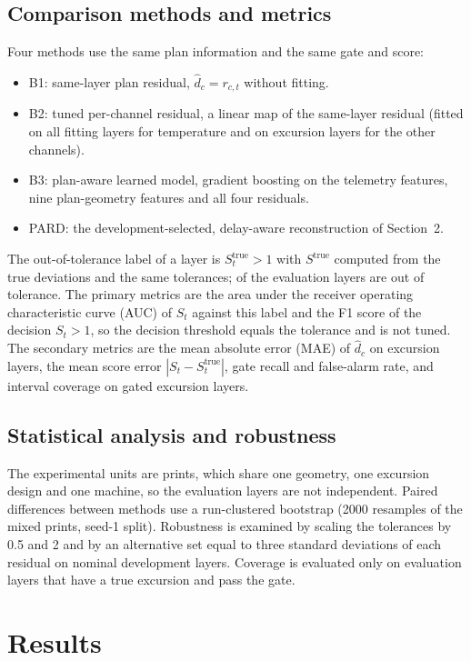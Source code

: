 \documentclass[10pt,a4paper,twocolumn]{article}
\begin{document}
\subsection{Comparison methods and metrics}
Four methods use the same plan information and the same gate and score:
\begin{itemize}
\item B1: same-layer plan residual, $\widehat d_c=r_{c,t}$ without fitting.
\item B2: tuned per-channel residual, a linear map of the same-layer residual (fitted on all fitting layers for temperature and on excursion layers for the other channels).
\item B3: plan-aware learned model, gradient boosting on the \nRaw{} telemetry features, nine plan-geometry features and all four residuals.
\item PARD: the development-selected, delay-aware reconstruction of Section~2.
\end{itemize}
The out-of-tolerance label of a layer is $S^{\mathrm{true}}_t>1$ with $S^{\mathrm{true}}$ computed from the true deviations and the same tolerances; \nOot{} of the \layersTest{} evaluation layers are out of tolerance. The primary metrics are the area under the receiver operating characteristic curve (AUC) of $S_t$ against this label and the F1 score of the decision $S_t>1$, so the decision threshold equals the tolerance and is not tuned. The secondary metrics are the mean absolute error (MAE) of $\widehat d_c$ on excursion layers, the mean score error $|S_t-S^{\mathrm{true}}_t|$, gate recall and false-alarm rate, and interval coverage on gated excursion layers.

\subsection{Statistical analysis and robustness}
The experimental units are prints, which share one geometry, one excursion design and one machine, so the \layersTest{} evaluation layers are not independent. Paired differences between methods use a run-clustered bootstrap (2000 resamples of the \printsTest{} mixed prints, seed-1 split). Robustness is examined by scaling the tolerances by 0.5 and 2 and by an alternative set equal to three standard deviations of each residual on nominal development layers. Coverage is evaluated only on evaluation layers that have a true excursion and pass the gate.

\section{Results}
\end{document}
